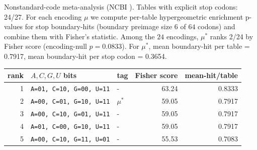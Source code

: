 Nonstandard-code meta-analysis (NCBI ). Tables with explicit stop codons: 24/27. For each encoding $\mu$ we compute per-table hypergeometric enrichment p-values for stop boundary-hits (boundary preimage size $6$ of $64$ codons) and combine them with Fisher's statistic. Among the $24$ encodings, $\mu^\ast$ ranks 2/24 by Fisher score (encoding-null $p=0.0833$). For $\mu^\ast$, mean boundary-hit per table = 0.7917, mean boundary-hit per stop codon = 0.3654.
\begin{center}
\small
\setlength{\tabcolsep}{6pt}
\renewcommand{\arraystretch}{1.15}
\begin{tabular}{rllrr}
\toprule
rank & $A,C,G,U$ bits & tag & Fisher score & mean-hit/table \\
\midrule
1 & \texttt{A=01, C=10, G=00, U=11} & - & 63.24 & 0.8333 \\
2 & \texttt{A=00, C=01, G=10, U=11} & $\mu^\ast$ & 59.05 & 0.7917 \\
3 & \texttt{A=00, C=10, G=01, U=11} & - & 59.05 & 0.7917 \\
4 & \texttt{A=01, C=00, G=10, U=11} & - & 59.05 & 0.7917 \\
5 & \texttt{A=00, C=10, G=11, U=01} & - & 55.53 & 0.7083 \\
\bottomrule
\end{tabular}
\end{center}
